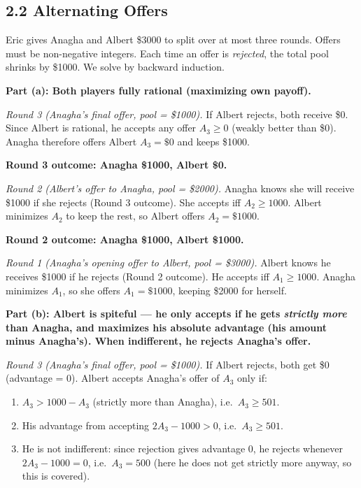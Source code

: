 \documentclass{article}
\begin{document}
\newpage
\subsection*{2.2 Alternating Offers}

Eric gives Anagha and Albert \$3000 to split over at most three rounds. Offers must be non-negative integers. Each time an offer is \emph{rejected}, the total pool shrinks by \$1000. We solve by backward induction.

\medskip
\noindent\textbf{Part (a): Both players fully rational (maximizing own payoff).}

\medskip
\noindent\textit{Round 3 (Anagha's final offer, pool = \$1000).}
If Albert rejects, both receive \$0. Since Albert is rational, he accepts any offer $A_3 \geq 0$ (weakly better than \$0). Anagha therefore offers Albert $A_3 = \$0$ and keeps \$1000.

\begin{center}
\textbf{Round 3 outcome: Anagha \$1000, Albert \$0.}
\end{center}

\noindent\textit{Round 2 (Albert's offer to Anagha, pool = \$2000).}
Anagha knows she will receive \$1000 if she rejects (Round 3 outcome). She accepts iff $A_2 \geq 1000$. Albert minimizes $A_2$ to keep the rest, so Albert offers $A_2 = \$1000$.

\begin{center}
\textbf{Round 2 outcome: Anagha \$1000, Albert \$1000.}
\end{center}

\noindent\textit{Round 1 (Anagha's opening offer to Albert, pool = \$3000).}
Albert knows he receives \$1000 if he rejects (Round 2 outcome). He accepts iff $A_1 \geq 1000$. Anagha minimizes $A_1$, so she offers $A_1 = \$1000$, keeping \$2000 for herself.

\begin{center}
\end{center}

\medskip
\noindent\textbf{Part (b): Albert is spiteful --- he only accepts if he gets \emph{strictly more} than Anagha, and maximizes his absolute advantage (his amount minus Anagha's). When indifferent, he rejects Anagha's offer.}

\medskip
\noindent\textit{Round 3 (Anagha's final offer, pool = \$1000).}
If Albert rejects, both get \$0 (advantage = 0). Albert accepts Anagha's offer of $A_3$ only if:
\begin{enumerate}
    \item $A_3 > 1000 - A_3$ (strictly more than Anagha), i.e.\ $A_3 \geq 501$.
    \item His advantage from accepting $2A_3 - 1000 > 0$, i.e.\ $A_3 \geq 501$.
    \item He is not indifferent: since rejection gives advantage 0, he rejects whenever $2A_3 - 1000 = 0$, i.e.\ $A_3 = 500$ (here he does not get strictly more anyway, so this is covered).
\end{enumerate}
\end{document}
